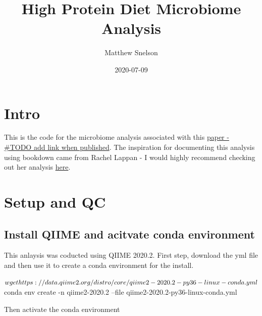 \documentclass[]{book}
\title{High Protein Diet Microbiome Analysis}
\author{Matthew Snelson}
\date{2020-07-09}
\newenvironment{Shaded}{\begin{snugshade}}{\end{snugshade}}
\newcommand{\ExtensionTok}[1]{#1}
\newcommand{\FunctionTok}[1]{\textcolor[rgb]{0.00,0.00,0.00}{#1}}
\newcommand{\NormalTok}[1]{#1}
\begin{document}
\maketitle

{
\setcounter{tocdepth}{1}
\tableofcontents
}
\hypertarget{intro}{%
\chapter{Intro}\label{intro}}

This is the code for the microbiome analysis associated with this \href{}{paper - \#TODO add link when published}. The inspiration for documenting this analysis using bookdown came from Rachel Lappan - I would highly recommend checking out her analysis \href{https://rachaellappan.github.io/VL-QIIME2-analysis/pre-processing-of-sequence-reads.html}{here}.

\hypertarget{setup-and-qc}{%
\chapter{Setup and QC}\label{setup-and-qc}}

\hypertarget{install-qiime-and-acitvate-conda-environment}{%
\section{Install QIIME and acitvate conda environment}\label{install-qiime-and-acitvate-conda-environment}}

This anlaysis was coducted using QIIME 2020.2. First step, download the yml file and then use it to create a conda environment for the install.

\begin{Shaded}
\begin{Highlighting}[]
\NormalTok{$ }\FunctionTok{wget}\NormalTok{ https://data.qiime2.org/distro/core/qiime2-2020.2-py36-linux-conda.yml}
\NormalTok{$ }\ExtensionTok{conda}\NormalTok{ env create -n qiime2-2020.2 --file qiime2-2020.2-py36-linux-conda.yml}
\end{Highlighting}
\end{Shaded}

Then activate the conda environment

\begin{Shaded}
\end{Shaded}
\end{document}
